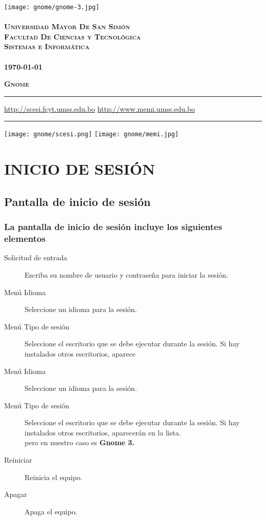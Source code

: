 \documentclass[12pt,letterpaper]{book}
\begin{document}
 \begin{titlepage}
	\thispagestyle{empty}
	\begin{center}
		\texttt{[image: gnome/gnome-3.jpg]} \\
		~\\
		\Large{\textsc{\bf Universidad Mayor De San Simón}}\\
		\large{\textsc{\bf Facultad De Ciencias y Tecnológica}}\\
		\large{\textsc{\bf Sistemas e Informática}}\\
		~\\
		\small{\bf \today}
	\end{center}
 	\vfill
	\begin{center}
		\Huge{\textsc{\bf Gnome}}
	\end{center}
	\vfill
	\hrule
	\vspace{0.1cm}
	\noindent\small{\url{http://scesi.fcyt.umss.edu.bo} \hfill \url{http://www.memi.umss.edu.bo}}
	\hrule
	\vspace{0.1cm}
	\noindent\small{\hspace{1.15cm}\texttt{[image: gnome/scesi.png]} \hfill \texttt{[image: gnome/memi.jpg]}\hspace{0.83cm}}

\end{titlepage}

\tableofcontents
\part{INICIO DE SESIÓN}
\chapter{Pantalla de inicio de sesión}
\section{La pantalla de inicio de sesión incluye los siguientes elementos}
\begin{description}
\item[Solicitud de entrada] Escriba su nombre de usuario y contraseña para iniciar la sesión.
\item[Menú Idioma] Seleccione un idioma para la sesión.
\item [Menú Tipo de sesión] Seleccione el escritorio que se debe ejecutar durante la sesión. Si hay instalados otros escritorios, aparece
\item[Menú Idioma] Seleccione un idioma para la sesión.
\item [Menú Tipo de sesión] Seleccione el escritorio que se debe ejecutar durante la sesión. Si hay instalados otros escritorios, aparecerán en la lista.\\ pero en nuestro caso es {\bf Gnome 3.}
\item[Reiniciar] Reinicia el equipo.
\item[Apagar] Apaga el equipo.
\end{description}
\end{document}
